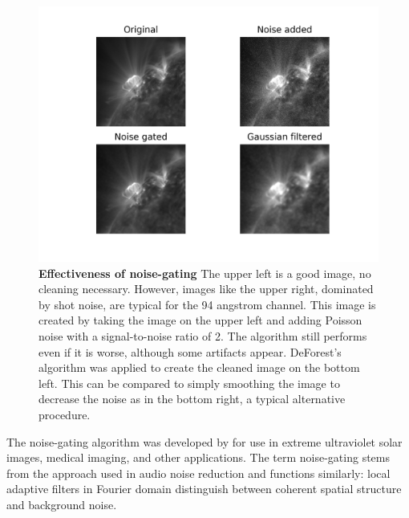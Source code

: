 \documentclass[twoside]{report}
\begin{document}
\begin{figure}[ht]
  \begin{center}
    \includegraphics[scale=0.8]{noise-gate.png}
    \caption{{\bf Effectiveness of noise-gating} The upper left is a good image, no cleaning necessary. However, images like the upper right, dominated by shot noise, are typical for the 94 angstrom channel. This image is created by taking the image on the upper left and adding Poisson noise with a signal-to-noise ratio of 2. The algorithm still performs even if it is worse, although some artifacts appear. DeForest's algorithm was applied to create the cleaned image on the bottom left. This can be compared to simply smoothing the image to decrease the noise as in the bottom right, a typical alternative procedure.}
    \label{fig:noise-gate-example}
 \end{center}
\end{figure}

The noise-gating algorithm was developed by \cite{deforest:2017} for use in extreme ultraviolet solar images, medical imaging, and other applications. The term noise-gating stems from the approach used in audio noise reduction and functions similarly: local adaptive filters in Fourier domain distinguish between coherent spatial structure and background noise. 
\end{document}
